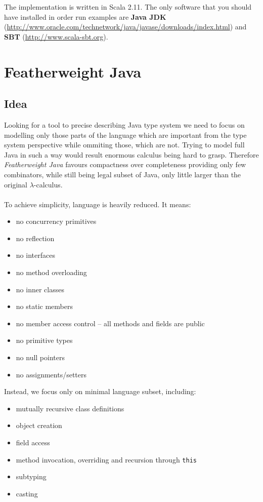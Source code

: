 \documentclass{article}[12pt]
\begin{document}
The implementation is written in Scala 2.11. The only software
that you should have installed in order run examples are
\textbf{Java JDK}
(\url{http://www.oracle.com/technetwork/java/javase/downloads/index.html})
and \textbf{SBT} (\url{http://www.scala-sbt.org}).

\section{Featherweight Java}

\subsection{Idea}

Looking for a tool to precise describing Java type system we need
to focus on modelling only those parts of the language which are
important from the type system perspective while ommiting those,
which are not. Trying to model full Java in such a way would result
enormous calculus being hard to grasp. Therefore
\emph{Featherweight Java} favours compactness over completeness
providing only few combinators, while still being legal subset
of Java, only little larger than the original $\lambda$-calculus.
\\
\\
To achieve simplicity, language is heavily reduced. It means:

\begin{itemize}
\item no concurrency primitives
\item no reflection
\item no interfaces
\item no method overloading
\item no inner classes
\item no static members
\item no member access control -- all methods and fields are public
\item no primitive types
\item no null pointers
\item no assignments/setters
\end{itemize}
Instead, we focus only on minimal language subset, including:

\begin{itemize}
\item mutually recursive class definitions
\item object creation
\item field access
\item method invocation, overriding and recursion through \texttt{this}
\item subtyping
\item casting
\end{itemize}
\end{document}
